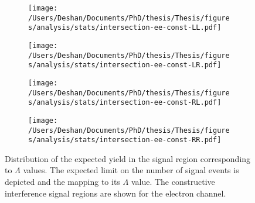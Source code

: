 \begin{figure}[h!]
    \centering
    \begin{subfigure}[b]{0.49\textwidth}
        \centering
        \texttt{[image: /Users/Deshan/Documents/PhD/thesis/Thesis/figures/analysis/stats/intersection-ee-const-LL.pdf]}
        \label{fig:bkgmodel:interpee1}
    \end{subfigure}
    \begin{subfigure}[b]{0.49\textwidth}
        \centering
        \texttt{[image: /Users/Deshan/Documents/PhD/thesis/Thesis/figures/analysis/stats/intersection-ee-const-LR.pdf]}
        \label{fig:bkgmodel:interpee2}
    \end{subfigure}
    \begin{subfigure}[b]{0.49\textwidth}
        \centering
        \texttt{[image: /Users/Deshan/Documents/PhD/thesis/Thesis/figures/analysis/stats/intersection-ee-const-RL.pdf]}
        \label{fig:bkgmodel:interpee3}
    \end{subfigure}
    \begin{subfigure}[b]{0.49\textwidth}
        \centering
        \texttt{[image: /Users/Deshan/Documents/PhD/thesis/Thesis/figures/analysis/stats/intersection-ee-const-RR.pdf]}
        \label{fig:bkgmodel:interpee4}
    \end{subfigure}
    \caption{Distribution of the expected yield in the signal region corresponding to $\Lambda$ values. The expected limit on the number of signal events is depicted and the mapping to its $\Lambda$ value. The constructive interference signal regions are shown for the electron channel.}
    \label{fig:stats:interpeeconst}
\end{figure}

